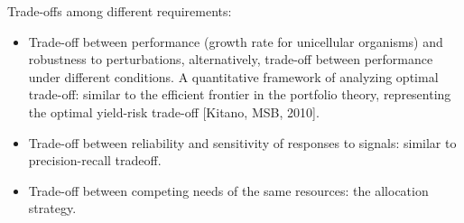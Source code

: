 \documentclass{report}
\begin{document}
Trade-offs among different requirements:   
\begin{itemize}
\item Trade-off between performance (growth rate for unicellular organisms) and robustness to perturbations, alternatively, trade-off between performance under different conditions. A quantitative framework of analyzing optimal trade-off: similar to the efficient frontier in the portfolio theory, representing the optimal yield-risk trade-off [Kitano, MSB, 2010].
\item Trade-off between reliability and sensitivity of responses to signals: similar to precision-recall tradeoff. 
\item Trade-off between competing needs of the same resources: the allocation strategy. 
\end{itemize}	
	
\end{document}
